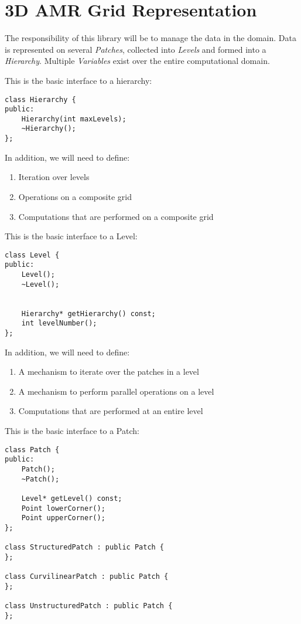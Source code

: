 
\section{3D AMR Grid Representation} 

The responsibility of this library will be to manage the data in the
domain.  Data is represented on several {\em Patches}, collected into
{\em Levels} and formed into a {\em Hierarchy}.  Multiple {\em
Variables} exist over the entire computational domain.

\vspace{0.5in}

This is the basic interface to a hierarchy:
\begin{verbatim}
class Hierarchy {
public:
	Hierarchy(int maxLevels);
	~Hierarchy();
};
\end{verbatim}

In addition, we will need to define:
\begin{enumerate}
\item Iteration over levels
\item Operations on a composite grid
\item Computations that are performed on a composite grid
\end{enumerate}

\vspace{0.5in}


This is the basic interface to a Level:
\begin{verbatim}
class Level {
public:
	Level();
	~Level();


	Hierarchy* getHierarchy() const;	
	int levelNumber();
};
\end{verbatim}

In addition, we will need to define:
\begin{enumerate}
\item A mechanism to iterate over the patches in a level
\item A mechanism to perform parallel operations on a level
\item Computations that are performed at an entire level
\end{enumerate}


\vspace{0.5in}

This is the basic interface to a Patch:
\begin{verbatim}
class Patch {
public:
	Patch();
	~Patch();

	Level* getLevel() const;
	Point lowerCorner();
	Point upperCorner();
};

class StructuredPatch : public Patch {
};

class CurvilinearPatch : public Patch {
};

class UnstructuredPatch : public Patch {
};

\end{verbatim}

